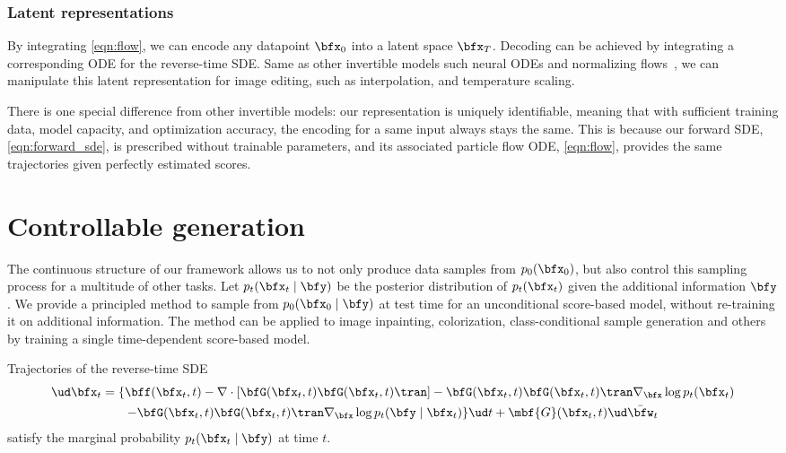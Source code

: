 \subsubsection{Latent representations}
By integrating \cref{eqn:flow}, we can encode any datapoint $\bfx_0$ into a latent space $\bfx_T$. Decoding can be achieved by integrating a corresponding ODE for the reverse-time SDE. Same as other invertible models such neural ODEs and normalizing flows~\citep{dinh2016density,song2019mintnet}, we can manipulate this latent representation for image editing, such as interpolation, and temperature scaling. 

There is one special difference from other invertible models: our representation is uniquely identifiable, meaning that with sufficient training data, model capacity, and optimization accuracy, the encoding for a same input always stays the same. This is because our forward SDE, \cref{eqn:forward_sde}, is prescribed without trainable parameters, and its associated particle flow ODE, \cref{eqn:flow}, provides the same trajectories given perfectly estimated scores. 


\section{Controllable generation}
The continuous structure of our framework allows us to not only produce data samples from $p_0(\bfx_0)$, but also control this sampling process for a multitude of other tasks. Let $p_t(\bfx_t \mid \bfy)$ be the posterior distribution of $p_t(\bfx_t)$ given the additional information $\bfy$. We provide a principled method to sample from $p_0(\bfx_0 \mid \bfy)$ at test time for an unconditional score-based model, without re-training it on additional information. The method can be applied to image inpainting, colorization, class-conditional sample generation and others by training a single time-dependent score-based model.


\begin{theorem}
Trajectories of the reverse-time SDE
\begin{multline}
\ud \bfx_t = \{\bff(\bfx_t, t) - \nabla \cdot [\bfG(\bfx_t, t) \bfG(\bfx_t,t)\tran] - \bfG(\bfx_t,t)\bfG(\bfx_t,t)\tran  \nabla_\bfx  \log p_t(\bfx_t)\\ - \bfG(\bfx_t,t)\bfG(\bfx_t,t)\tran  \nabla_\bfx  \log p_t(\bfy \mid \bfx_t)\} \ud t + \mbf{G}(\bfx_t, t) \ud \bar{\bfw}_t
\end{multline}
satisfy the marginal probability $p_t(\bfx_t \mid \bfy)$ at time $t$.
\end{theorem}


